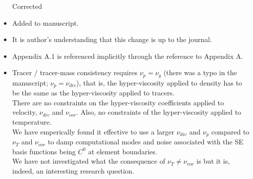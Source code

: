 \documentclass[11pt]{article}
\begin{document}
\begin{itemize}
Corrected

\item {\color{blue}{L225: ... only if there are no condensates present at higher levels ...}}

Added to manuscript.

\item {\color{blue}{L261: Numbering of appendices: currently the subsections of appendix A are numbered as A.1, A.2 and A.3. This numbering is also used for equations in Appendix A. Please use a different numbering of the appendix sections, e.g. A.a, A.b and A.c.}}

It is author's understanding that this change is up to the journal.

\item {\color{blue}{Please add a reference to Appendix A.1. I couldn't find any.}}

Appendix A.1 is referenced implicitly through the reference to Appendix A.

\item {}

Tracer / tracer-mass consistency requires $\nu_p = \nu_q$ (there was a typo in the manuscript; $\nu_p =\nu_{div}$), that is, the hyper-viscosity applied to density has to be the same as the hyper-viscosity applied to tracers.\\

There are no constraints on the hyper-viscosity coefficients applied to velocity, $\nu_{div}$ and $\nu_{vor}$.  Also, no constraints of the hyper-viscosity applied to temperature.\\

We have emperically found it effective to use a larger $\nu_{div}$ and $\nu_p$ compared to $\nu_T$ and $\nu_{vor}$ to damp computational modes and noise associated with the SE basis functions being $C^0$ at element boundaries.\\

We have not investigated what the consequence of  $\nu_T \neq \nu_{vor}$ is but it is, indeed, an interesting research question.\\


\end{itemize}
\end{document}
